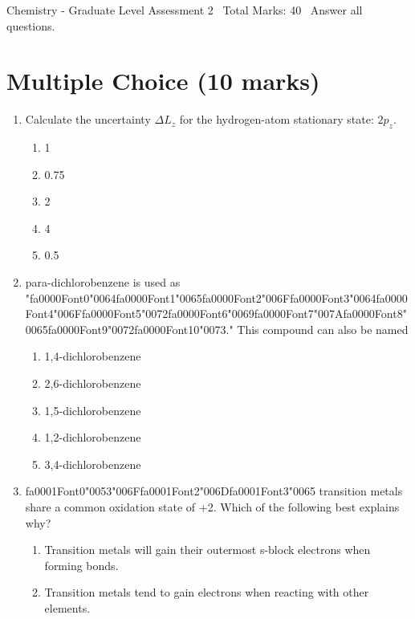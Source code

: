\documentclass[12pt]{article}
\begin{document}
\begin{center}
Chemistry - Graduate Level Assessment 2 \
Total Marks: 40 \
Answer all questions.
\end{center}

\section*{Multiple Choice (10 marks)}
\begin{enumerate}[label=\arabic*.]
\item Calculate the uncertainty $\Delta L_z$ for the hydrogen-atom stationary state: $2 p_z$.
\begin{enumerate}[label=(\alph*)]
    \item 1
    \item 0.75
    \item 2
    \item 4
    \item 0.5
\end{enumerate}
\item para-dichlorobenzene is used as "{\csname fa0000Font0\endcsname\char"0064}{\csname fa0000Font1\endcsname\char"0065}{\csname fa0000Font2\endcsname\char"006F}{\csname fa0000Font3\endcsname\char"0064}{\csname fa0000Font4\endcsname\char"006F}{\csname fa0000Font5\endcsname\char"0072}{\csname fa0000Font6\endcsname\char"0069}{\csname fa0000Font7\endcsname\char"007A}{\csname fa0000Font8\endcsname\char"0065}{\csname fa0000Font9\endcsname\char"0072}{\csname fa0000Font10\endcsname\char"0073}." This compound can also be named
\begin{enumerate}[label=(\alph*)]
    \item 1,4-dichlorobenzene
    \item 2,6-dichlorobenzene
    \item 1,5-dichlorobenzene
    \item 1,2-dichlorobenzene
    \item 3,4-dichlorobenzene
\end{enumerate}
\item {\csname fa0001Font0\endcsname\char"0053}{\char"006F}{\csname fa0001Font2\endcsname\char"006D}{\csname fa0001Font3\endcsname\char"0065} transition metals share a common oxidation state of +2. Which of the following best
explains why?
\begin{enumerate}[label=(\alph*)]
    \item Transition metals will gain their outermost s-block electrons when forming bonds.
    \item Transition metals tend to gain electrons when reacting with other elements.

\end{enumerate}
\end{enumerate}
\end{document}
